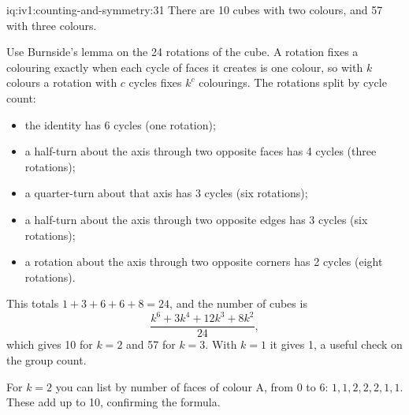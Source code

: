 \begin{solution}{iq:iv1:counting-and-symmetry:31}
There are 10 cubes with two colours, and 57 with three colours.

Use Burnside's lemma on the 24 rotations of the cube. A rotation fixes a colouring exactly when each cycle of faces it creates is one colour, so with $k$ colours a rotation with $c$ cycles fixes $k^c$ colourings. The rotations split by cycle count:
\begin{itemize}
\item the identity has 6 cycles (one rotation);
\item a half-turn about the axis through two opposite faces has 4 cycles (three rotations);
\item a quarter-turn about that axis has 3 cycles (six rotations);
\item a half-turn about the axis through two opposite edges has 3 cycles (six rotations);
\item a rotation about the axis through two opposite corners has 2 cycles (eight rotations).
\end{itemize}
This totals $1 + 3 + 6 + 6 + 8 = 24$, and the number of cubes is
\[
\frac{k^6 + 3k^4 + 12k^3 + 8k^2}{24},
\]
which gives 10 for $k = 2$ and 57 for $k = 3$. With $k = 1$ it gives 1, a useful check on the group count.

For $k = 2$ you can list by number of faces of colour A, from 0 to 6: $1, 1, 2, 2, 2, 1, 1$. These add up to 10, confirming the formula.

\end{solution}

